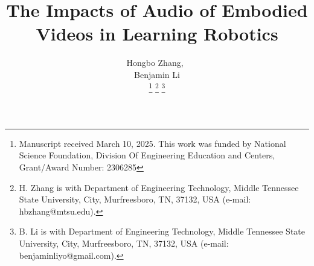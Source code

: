     \title{The Impacts of Audio of Embodied Videos in Learning Robotics}
  \author{Hongbo Zhang,~  \\
      Benjamin Li%

  \thanks{Manuscript received March 10, 2025. This work was funded  by National Science Foundation, Division Of Engineering Education and Centers, Grant/Award Number: 2306285}
  \thanks{H. Zhang is with Department of Engineering Technology, Middle Tennessee State University, City, Murfreesboro, TN, 37132, USA (e-mail: hbzhang@mtsu.edu).}%
  \thanks{B. Li is with Department of Engineering Technology, Middle Tennessee State University, City, Murfreesboro, TN, 37132, USA (e-mail:
benjaminliyo@gmail.com).}%
}




\maketitle




